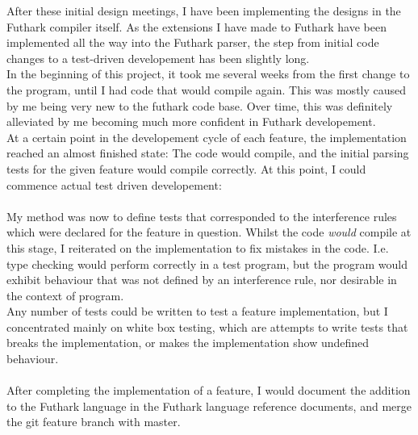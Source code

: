 After these initial design meetings, I have been implementing the designs in the
Futhark compiler itself. As the extensions I have made to Futhark have been
implemented all the way into the Futhark parser, the step from initial code
changes to a test-driven developement has been slightly long.
\\
In the beginning of this project, it took me several weeks from the first change to the program, until
I had code that would compile again. This was mostly caused by me being very
new to the futhark code base. Over time, this was definitely alleviated by me
becoming much more confident in Futhark developement.
\\
At a certain point in the developement cycle of each feature, the implementation
reached an almost finished state: The code would compile, and the initial
parsing tests for the given feature would compile correctly. At this point, I
could commence actual test driven developement:
\\
\\
My method was now to define tests that corresponded to the interference rules
which were declared for the feature in question. Whilst the code \textit{would}
compile at this stage, I reiterated on the implementation to fix mistakes in the
code.
I.e. type checking would perform correctly in a test program, but the program
would exhibit behaviour that was not defined by an interference rule, nor
desirable in the context of program.
\\
Any number of tests could be written to test a feature implementation, but I
concentrated mainly on white box testing, which are attempts to write tests that
breaks the implementation, or makes the implementation show undefined behaviour.
\\
\\
After completing the implementation of a feature, I would document the addition
to the Futhark language in the Futhark language reference documents, and merge
the git feature branch with master.
